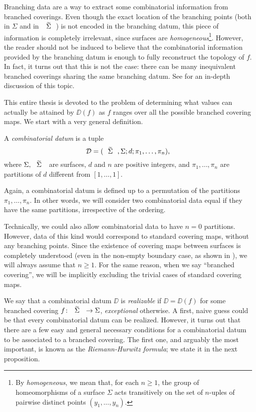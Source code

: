 Branching data are a way to extract some combinatorial information from branched coverings. Even though the exact location of the branching points (both in $\Sigma$ and in $\tSigma$) is not encoded in the branching datum, this piece of information is completely irrelevant, since surfaces are \emph{homogeneous}\footnote{By \emph{homogeneous}, we mean that, for each $n\ge 1$, the group of homeomorphisms of a surface $\Sigma$ acts transitively on the set of $n$-uples of pairwise distinct points $(y_1,\ldots,y_n)$.}. However, the reader should not be induced to believe that the combinatorial information provided by the branching datum is enough to fully reconstruct the topology of $f$. In fact, it turns out that this is not the case: there can be many inequivalent branched coverings sharing the same branching datum. See \cite{sarti} for an in-depth discussion of this topic.

This entire thesis is devoted to the problem of determining what values can actually be attained by $\DD(f)$ as $f$ ranges over all the possible branched covering maps. We start with a very general definition.

\begin{definition}
A \emph{combinatorial datum} is a tuple
\[
\DD=\datum{\tSigma,\Sigma}{d}{\pi_1,\ldots,\pi_n},
\]
where $\Sigma,\tSigma$ are surfaces, $d$ and $n$ are positive integers, and $\pi_1,\ldots,\pi_n$ are partitions of $d$ different from $[1,\ldots,1]$.
\end{definition}

Again, a combinatorial datum is defined up to a permutation of the partitions $\pi_1,\ldots,\pi_n$. In other words, we will consider two combinatorial data equal if they have the same partitions, irrespective of the ordering.

Technically, we could also allow combinatorial data to have $n=0$ partitions. However, data of this kind would correspond to standard covering maps, without any branching points. Since the existence of covering maps between surfaces is completely understood  (even in the non-empty boundary case, as shown in \cite{massey-covering}), we will always assume that $n\ge 1$. For the same reason, when we say ``branched covering'', we will be implicitly excluding the trivial cases of standard covering maps.

We say that a combinatorial datum $\DD$ is \emph{realizable} if $\DD=\DD(f)$ for some branched covering $\map{f}{\tSigma}{\Sigma}$, \emph{exceptional} otherwise. A first, naive guess could be that every combinatorial datum can be realized. However, it turns out that there are a few easy and general necessary conditions for a combinatorial datum to be associated to a branched covering. The first one, and arguably the most important, is known as the \emph{Riemann-Hurwitz formula}; we state it in the next proposition.

